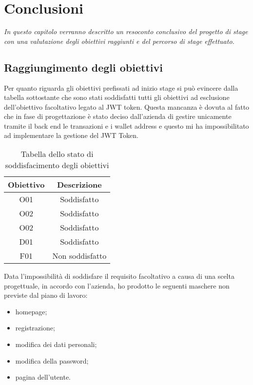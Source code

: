 
\chapter{Conclusioni}
\label{cap:conclusioni}

\textit{In questo capitolo verranno descritto un resoconto conclusivo del progetto di stage con una valutazione degli obiettivi raggiunti e del percorso di stage effettuato.}

\section{Raggiungimento degli obiettivi}
\label{sec:raggiungimento-obiettivi}

Per quanto riguarda gli obiettivi prefissati ad inizio stage si può evincere dalla tabella sottostante che sono stati soddisfatti tutti gli obiettivi ad esclusione dell'obiettivo facoltativo legato al JWT token. Questa mancanza è dovuta al fatto che in fase di progettazione è stato deciso dall'azienda di gestire unicamente tramite il back end le transazioni e i wallet address e questo mi ha impossibilitato ad implementare la gestione del JWT Token.

\begin{table}[H]
	\caption{Tabella dello stato di soddisfacimento degli obiettivi}
	\label{tab:obiettivi-raggiunti}
	\renewcommand{\arraystretch}{1.6}
	\begin{center}
	\begin{tabularx}{0.4\textwidth}{c|c}
		\hline\hline
		\textbf{Obiettivo} & \textbf{Descrizione}\\
		\hline
		O01 & Soddisfatto\\
		\hline
		O02 & Soddisfatto\\
		\hline
		O02 & Soddisfatto\\
		\hline
		D01 & Soddisfatto\\
		\hline
		F01 & Non soddisfatto\\
		\hline
	\end{tabularx}
	\end{center}
\end{table}%

Data l'impossibilità di soddisfare il requisito facoltativo a causa di una scelta progettuale, in accordo con l'azienda, ho prodotto le seguenti maschere non previste dal piano di lavoro:
\begin{itemize}
	\item homepage;
	\item registrazione;
	\item modifica dei dati personali;
	\item modifica della password;
	\item pagina dell'utente.
\end{itemize}

